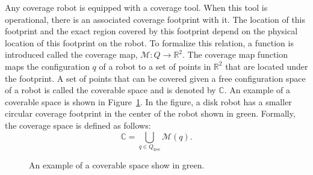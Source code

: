 \documentclass[../main.tex]{subfiles}
\begin{document}
Any coverage robot is equipped with a coverage tool. When this tool is operational, there is an associated coverage footprint with it. The location of this footprint and the exact region covered by this footprint depend on the physical location of this footprint on the robot. To formalize this relation, a function is introduced called the coverage map, $\mathcal{M}:Q\to \mathbb{R}^2$. The coverage map function maps the configuration $q$ of a robot to a set of points in $\mathbb{R}^2$ that are located under the footprint. A set of points that can be covered given a free configuration space of a robot is called the coverable space and is denoted by $\mathbb{C}$. An example of a coverable space is shown in Figure~\ref{fig:coverable_space}. In the figure, a disk robot has a smaller circular coverage footprint in the center of the robot shown in green. Formally, the coverage space is defined as follows:
\begin{equation}
	\mathbb{C}=\bigcup_{q\in Q_{\text{free}}}\mathcal{M}(q).
\end{equation}
\begin{figure}
	\centering
	
	\caption{An example of a coverable space show in green.}
	\label{fig:coverable_space}
\end{figure}










\end{document}
